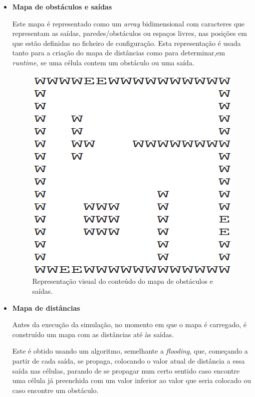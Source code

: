 \documentclass[12pt]{article}
\begin{document}
\begin{titlepage}
\begin{itemize}
\begin{itemize}

\item \textbf{Mapa de obstáculos e saídas}

Este mapa é representado como um \textit{array} bidimensional com caracteres que representam as saídas, paredes/obstáculos ou espaços livres, nas posições em que estão definidas no ficheiro de configuração. Esta representação é usada tanto para a criação do mapa de distâncias como para determinar,em \textit{runtime}, se uma célula contem um obstáculo ou uma saída.

\begin{figure}[H]
	\centering
	\includegraphics[scale=0.2]{map_text.png}
	\caption{Representação visual do conteúdo do mapa de obstáculos e saídas.}
	\label{map}
\end{figure}

\item \textbf{Mapa de distâncias}

Antes da execução da simulação, no momento em que o mapa é carregado, é construído um mapa com as distâncias até às saídas. 

Este é obtido usando um algoritmo, semelhante a \textit{flooding}, que, começando a partir de cada saída, se propaga, colocando o valor atual de distância a essa saída nas células, parando de se propagar num certo sentido caso encontre uma célula já preenchida com um valor inferior ao valor que seria colocado ou caso encontre um obstáculo.


\end{itemize}
\end{itemize}
\end{titlepage}
\end{document}
